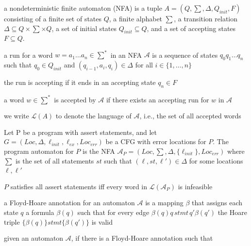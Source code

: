 \documentclass[landscape, a4paper]{article}
\begin{document}
\begin{minipage}[t]{0.2\linewidth}
	\begin{betterlist}
		\item a \alert{nondeterministic finite automaton (NFA)} is a tuple $A = (Q, \sum , \Delta , Q_{init}, F)$ consisting of a finite set of states $Q$, a finite alphabet $\sum$, a transition relation $\Delta \subseteq Q × \sum  × Q$, a set of initial states $Q_{init} \subseteq Q$, and a set of accepting states $F \subseteq Q$.
		\begin{betterlist}
			\item a \alert{run} for a word $w = a_1\ldots a_n \in \sum^{*}$ in an NFA $\mathcal{A}$ is a sequence of states $q_0q_1\ldots q_n$ such that $q_0 \in Q_{init}$ and $(q_{i−1}, a_{i}, q_{i}) \in \Delta$ for all $i \in \{1,\ldots , n\}$
			\begin{betterlist}
				\item the run is \alert{accepting} if it ends in an accepting state $q_n \in F$
			\end{betterlist}
			\item a word $w \in \sum ^*$ is \alert{accepted} by $\mathcal{A}$ if there exists an accepting run for $w$ in $\mathcal{A}$
			\item we write $\mathcal{L}(A)$ to denote the \alert{language of $\mathcal{A}$}, i.e., the set of all accepted words
		\end{betterlist}
  \item Let P be a program with assert statements, and let $G = (Loc, \Delta , \ell_{init}, \ell_{ex}, Loc_{err})$ be a CFG with error locations for $P$. \color{orange}The \alert{program automaton} for $P$ is the NFA $\mathcal{A}_P = (Loc, \sum , \Delta , \{ \ell_{init}\} , Loc_{err})$ where $\sum$ is the set of all statements $st$ such that $(\ell, st, \ell') \in \Delta$ for some locations $\ell, \ell'$\color{black}
		\begin{betterlist}
			\item $P$ satisfies all assert statements iff every word in $\mathcal{L}(\mathcal{A}_P)$ is infeasible
		\end{betterlist}
		\item \color{orange}a \alert{Floyd-Hoare annotation} for an automaton $\mathcal{A}$ is a mapping $\beta$ that assigns each state $q$ a formula $\beta(q)$ such that for every edge $\beta (q)q\, stmt\, q'\beta(q')$ the Hoare triple $\{\beta(q)\} stmt \{\beta(q′)\}$ is valid\color{black}
    \item \color{violet}given an automaton $\mathcal{A}$, if there is a Floyd-Hoare annotation such that

\end{betterlist}
\end{minipage}
\end{document}
